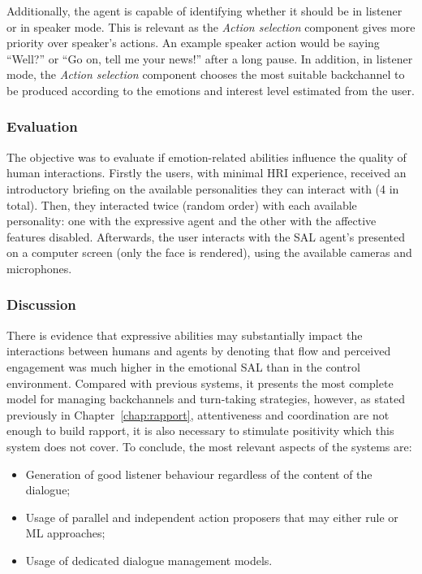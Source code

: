 Additionally, the agent is capable of identifying whether it should be in listener or in speaker mode. This is relevant as the \textit{Action selection} component gives more priority over speaker's actions. An example speaker action would be  saying ``Well?'' or ``Go on, tell me your news!'' after a long pause. In addition, in listener mode, the \textit{Action selection} component chooses the most suitable backchannel to be produced according to the emotions and interest level estimated from the user.

\subsubsection*{Evaluation}

The objective was to evaluate if emotion-related abilities influence the quality of human interactions. Firstly the users, with minimal \ac{HRI} experience, received an introductory briefing on the available personalities they can interact with (4 in total). Then, they interacted twice (random order) with each available personality: one with the expressive agent and the other with the affective features disabled. Afterwards, the user interacts with the \ac{SAL} agent's presented on a computer screen (only the face is rendered), using the available cameras and microphones.

\subsubsection*{Discussion}

There is evidence that expressive abilities may substantially impact the interactions between humans and agents by denoting that flow and perceived engagement was much higher in the emotional \ac{SAL} than in the control environment. Compared with previous systems, it presents the most complete model for managing backchannels and turn-taking strategies, however, as stated previously in Chapter~\ref{chap:rapport}, attentiveness and coordination are not enough to build rapport, it is also necessary to stimulate positivity which this system does not cover. To conclude, the most relevant aspects of the systems are:

\begin{itemize}
	\item Generation of good listener behaviour regardless of the content of the dialogue;
	\item Usage of parallel and independent action proposers that may either rule or \ac{ML} approaches;
	\item Usage of dedicated dialogue management models.
\end{itemize}